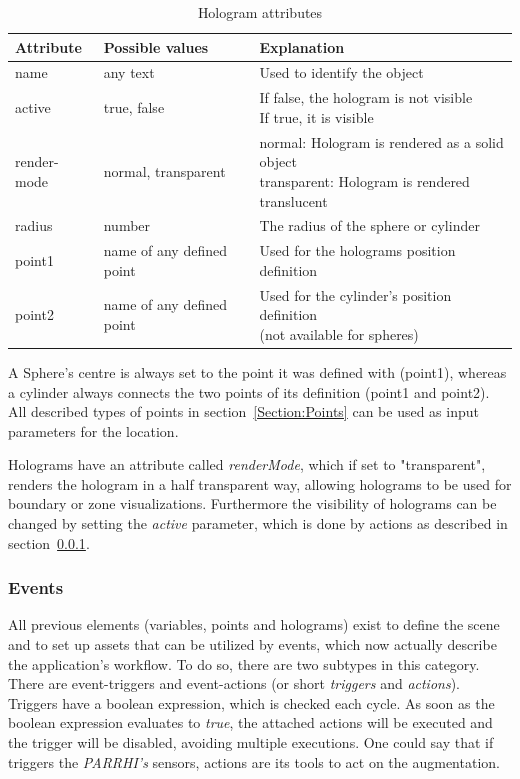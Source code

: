 \begin{table}[!htbp]
	\caption{Hologram attributes}
	\label{Table:HologramAttributes}
	\centering
	\begin{tabular}{lll}
		\toprule
		Attribute & Possible values		& Explanation	\\		
		\midrule
		name & any text & Used to identify the object \\
		active & true, false		& \parbox[t]{10cm}{If false, the hologram is not visible\\If true, it is visible}  \\
		render-mode& normal, transparent & \parbox[t]{10cm}{ normal: Hologram is rendered as a solid object \\ transparent: Hologram is rendered translucent}\\
		radius & number & The radius of the sphere or cylinder \\
		point1 & name of any defined point & Used for the holograms position definition \\
		point2 & name of any defined point & \parbox[t]{10cm}{ Used for the cylinder's position definition \\ (not available for spheres)} \\
		\bottomrule
	\end{tabular}
\end{table}

A Sphere's centre is always set to the point it was defined with (point1), whereas a cylinder always connects the two points of its definition (point1 and point2). All described types of points in section~\ref{Section:Points} can be used as input parameters for the location.

Holograms have an attribute called \textit{renderMode}, which if set to "transparent", renders the hologram in a half transparent way, allowing holograms to be used for boundary or zone visualizations. Furthermore the visibility of holograms can be changed by setting the \textit{active} parameter, which is done by actions as described in section~\ref{Section:Events}.

\subsubsection{Events}\label{Section:Events}
All previous elements (variables, points and holograms) exist to define the scene and to set up assets that can be utilized by events, which now actually describe the application's workflow. To do so, there are two subtypes in this category. There are event-triggers and event-actions (or short \textit{triggers} and \textit{actions}). Triggers have a boolean expression, which is checked each cycle. As soon as the boolean expression evaluates to \textit{true}, the attached actions will be executed and the trigger will be disabled, avoiding multiple executions. One could say that if triggers the \textit{PARRHI's} sensors, actions are its tools to act on the augmentation.

